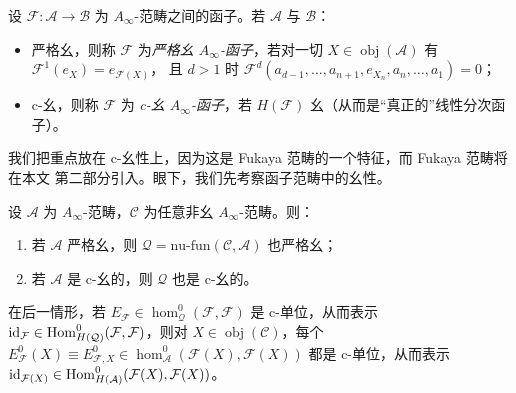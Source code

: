 \begin{Def}\label{def:2.25}
设 $\mathcal F:\mathcal A\to\mathcal B$ 为 $A_\infty$-范畴之间的函子。若 $\mathcal A$
与 $\mathcal B$：
\begin{itemize}
  \item 严格幺，则称 $\mathcal F$ 为\emph{严格幺 $A_\infty$-函子}，若对一切
        $X\in\operatorname{obj}(\mathcal A)$ 有 $\mathcal F^1(e_X)=e_{\mathcal F(X)}$，
        且 $d>1$ 时 $\mathcal F^d(a_{d-1},\dots,a_{n+1},e_{X_n},a_n,\dots,a_1)=0$；
  \item c-幺，则称 $\mathcal F$ 为 \emph{c-幺 $A_\infty$-函子}，若 $H(\mathcal F)$
        幺（从而是“真正的”线性分次函子）。
\end{itemize}
\end{Def}

我们把重点放在 c-幺性上，因为这是 Fukaya 范畴的一个特征，而 Fukaya 范畴将在本文
第二部分引入。眼下，我们先考察函子范畴中的幺性。

\begin{Pro}\label{pro:2.26}
设 $\mathcal A$ 为 $A_\infty$-范畴，$\mathcal C$ 为任意非幺 $A_\infty$-范畴。则：
\begin{enumerate}
  \item 若 $\mathcal A$ 严格幺，则 $\mathcal Q=\mathrm{nu\text{-}fun}(\mathcal C,
        \mathcal A)$ 也严格幺；
  \item 若 $\mathcal A$ 是 c-幺的，则 $\mathcal Q$ 也是 c-幺的。
\end{enumerate}
在后一情形，若 $E_{\mathcal F}\in\hom^0_{\mathcal Q}(\mathcal F,\mathcal F)$ 是
c-单位，从而表示 $\mathrm{id}_{\mathcal F}\in\operatorname{Hom}^0_{H(\mathcal Q)}(\mathcal F,
\mathcal F)$，则对 $X\in\operatorname{obj}(\mathcal C)$，每个
$E^0_{\mathcal F}(X)\equiv E^0_{\mathcal F,X}\in\hom^0_{\mathcal A}(\mathcal F(X),
\mathcal F(X))$ 都是 c-单位，从而表示 $\mathrm{id}_{\mathcal F(X)}\in
\operatorname{Hom}^0_{H(\mathcal A)}(\mathcal F(X),\mathcal F(X))$。
\end{Pro}

